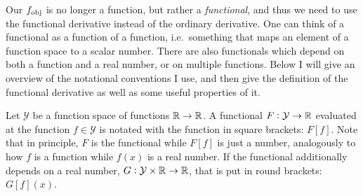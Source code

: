 \begin{tcolorbox}[title=On functionals and their derivatives, breakable,
	parbox=false]
Our $f_\text{obj}$ is no longer a function, but rather a \emph{functional}, and thus
we need to use the functional derivative instead of the ordinary derivative.
One can think of a functional as a function of a function,
i.e.\ something that maps an element of a function space to a scalar number.
There are also functionals which depend on both a function and a real number,
or on multiple functions.
Below I will give an overview of the notational conventions I use,
and then give the definition of the functional derivative as well as some useful
properties of it.

Let $\mathcal{Y}$ be a function space of functions $\mathbb{R} \to \mathbb{R}$.
A functional $F:\mathcal{Y} \to \mathbb{R}$ evaluated at the function
$f\in\mathcal{Y}$
is notated with the function in square brackets: $F[f]$.
Note that in principle, $F$ is the functional while $F[f]$ is just a
number,
analogously to how $f$ is a function while $f(x)$ is a real number.
If the functional additionally depends on a real number,
$G:\mathcal{Y} \times \mathbb{R} \to \mathbb{R}$,
that is put in round brackets: $G[f](x)$.


\end{tcolorbox}
